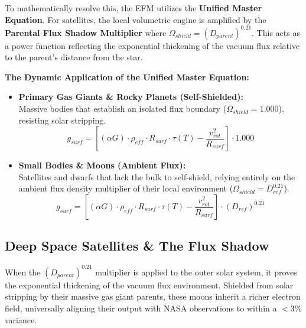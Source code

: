 \documentclass[11pt, a4paper]{article}
\begin{document}
To mathematically resolve this, the EFM utilizes the \textbf{Unified Master Equation}. For satellites, the local volumetric engine is amplified by the \textbf{Parental Flux Shadow Multiplier} where $\Omega_{shield} = (D_{parent})^{0.21}$. This acts as a power function reflecting the exponential thickening of the vacuum flux relative to the parent's distance from the star.

\vspace{1.0em}
\noindent \textbf{The Dynamic Application of the Unified Master Equation:}
\begin{itemize}
  \item \textbf{Primary Gas Giants \& Rocky Planets (Self-Shielded):}
  \\Massive bodies that establish an isolated flux boundary ($\Omega_{shield} = 1.000$), resisting solar stripping.
  $$g_{surf} = \left[ (\alpha G) \cdot \rho_{eff} \cdot R_{surf} \cdot \tau(T) - \frac{v_{rot}^2}{R_{surf}} \right] \cdot 1.000$$

  \item \textbf{Small Bodies \& Moons (Ambient Flux):}
  \\Satellites and dwarfs that lack the bulk to self-shield, relying entirely on the ambient flux density multiplier of their local environment ($\Omega_{shield} = D_{ref}^{0.21}$).
  $$g_{surf} = \left[ (\alpha G) \cdot \rho_{eff} \cdot R_{surf} \cdot \tau(T) - \frac{v_{rot}^2}{R_{surf}} \right] \cdot (D_{ref})^{0.21}$$
\end{itemize}

\clearpage
\subsection{Deep Space Satellites \& The Flux Shadow}
When the $(D_{parent})^{0.21}$ multiplier is applied to the outer solar system, it proves the exponential thickening of the vacuum flux environment. Shielded from solar stripping by their massive gas giant parents, these moons inherit a richer electron field, universally aligning their output with NASA observations to within a $<3\%$ variance.
\end{document}
